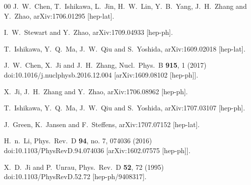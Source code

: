 \begin{thebibliography}{00}
	J.~W.~Chen, T.~Ishikawa, L.~Jin, H.~W.~Lin, Y.~B.~Yang, J.~H.~Zhang and Y.~Zhao,
	arXiv:1706.01295 [hep-lat].



	I.~W.~Stewart and Y.~Zhao,
	arXiv:1709.04933 [hep-ph].


	T.~Ishikawa, Y.~Q.~Ma, J.~W.~Qiu and S.~Yoshida,
	arXiv:1609.02018 [hep-lat].


	J.~W.~Chen, X.~Ji and J.~H.~Zhang,
	Nucl.\ Phys.\ B {\bf 915}, 1 (2017)
	doi:10.1016/j.nuclphysb.2016.12.004
	[arXiv:1609.08102 [hep-ph]].


	X.~Ji, J.~H.~Zhang and Y.~Zhao,
	arXiv:1706.08962 [hep-ph].


	T.~Ishikawa, Y.~Q.~Ma, J.~W.~Qiu and S.~Yoshida,
	arXiv:1707.03107 [hep-ph].

	J.~Green, K.~Jansen and F.~Steffens,
	arXiv:1707.07152 [hep-lat].


	H.~n.~Li,
	Phys.\ Rev.\ D {\bf 94}, no. 7, 074036 (2016)
	doi:10.1103/PhysRevD.94.074036
	[arXiv:1602.07575 [hep-ph]].


	X.~D.~Ji and P.~Unrau,
	Phys.\ Rev.\ D {\bf 52}, 72 (1995)
	doi:10.1103/PhysRevD.52.72
	[hep-ph/9408317].

\end{thebibliography}

